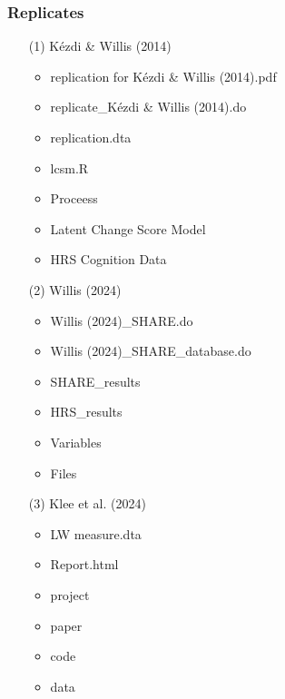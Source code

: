 \documentclass[12pt]{article}
\begin{document}
\subsubsection{Replicates}
\begin{itemize}
    \item[(1)] Kézdi \& Willis (2014)
    \begin{itemize}
        \item replication for Kézdi \& Willis (2014).pdf
        \item replicate\_Kézdi \& Willis (2014).do
        \item replication.dta
        \item lcsm.R
        \item Proceess
        \item Latent Change Score Model
        \item HRS Cognition Data
    \end{itemize}
    \item[(2)] Willis (2024)
    \begin{itemize}
        \item Willis (2024)\_SHARE.do
        \item Willis (2024)\_SHARE\_database.do
        \item SHARE\_results
        \item HRS\_results
        \item Variables
        \item Files
    \end{itemize}
    \item[(3)] Klee et al. (2024)
    \begin{itemize}
        \item LW measure.dta
        \item Report.html
        \item project
        \item paper
        \item code
        \item data
    \end{itemize}
\end{itemize}


\vspace{30pt}

\newpage
{}



\end{document}
